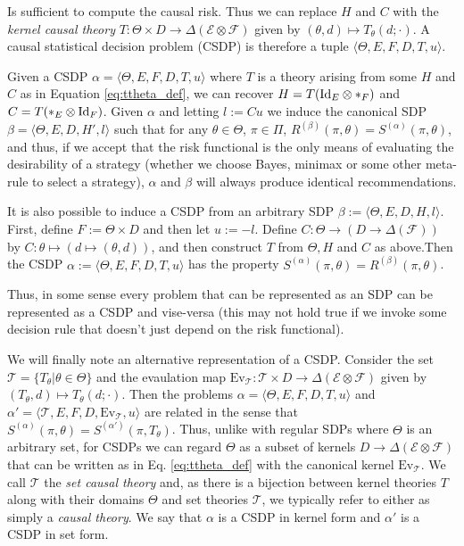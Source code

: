 Is sufficient to compute the causal risk.  Thus we can replace $H$ and $C$ with the \emph{kernel causal theory} $T:\Theta\times D\to \Delta(\mathcal{E}\otimes\mathcal{F})$ given by $(\theta,d)\mapsto T_\theta(d;\cdot)$. A causal statistical decision problem (CSDP) is therefore a tuple $\langle \Theta, E, F, D, T, u\rangle$.

Given a CSDP $\alpha = \langle \Theta, E, F, D, T, u\rangle$ where $T$ is a theory arising from some $H$ and $C$ as in Equation \ref{eq:ttheta_def}, we can recover $H= T(\text{Id}_{E}\otimes *_F)$ and $C=T(*_E\otimes \text{Id}_{F})$. Given $\alpha$ and letting $l:= Cu$ we induce the canonical SDP $\beta=\langle \Theta, E, D, H', l\rangle$ such that for any $\theta\in \Theta$, $\pi\in \Pi$, $R^{(\beta)}(\pi,\theta) = S^{(\alpha)}(\pi,\theta)$, and thus, if we accept that the risk functional is the only means of evaluating the desirability of a strategy (whether we choose Bayes, minimax or some other meta-rule to select a strategy), $\alpha$ and $\beta$ will always produce identical recommendations.

It is also possible to induce a CSDP from an arbitrary SDP $\beta:=\langle \Theta, E, D, H, l\rangle$. First, define $F:=\Theta\times D$ and then let $u:=-l$. Define $C:\Theta\to (D\to \Delta(\mathcal{F}))$ by $C:\theta\mapsto (d\mapsto (\theta,d))$, and then construct $T$ from $\Theta, H$ and $C$ as above.Then the CSDP $\alpha:=\langle \Theta, E, F, D, T, u\rangle$ has the property $S^{(\alpha)}(\pi, \theta) = R^{(\beta)}(\pi,\theta)$.

Thus, in some sense every problem that can be represented as an SDP can be represented as a CSDP and vise-versa (this may not hold true if we invoke some decision rule that doesn't just depend on the risk functional).

We will finally note an alternative representation of a CSDP. Consider the set $\mathscr{T} = \{T_\theta|\theta\in \Theta\}$ and the evaulation map $\mathrm{Ev}_{\mathscr{T}}:\mathscr{T}\times D\to \Delta(\mathcal{E}\otimes\mathcal{F})$ given by $(T_\theta,d)\mapsto T_\theta(d;\cdot)$. Then the problems $\alpha = \langle \Theta, E, F, D, T, u\rangle$ and $\alpha'=\langle \mathscr{T}, E, F, D, \mathrm{Ev}_{\mathcal{T}}, u\rangle$ are related in the sense that $S^{(\alpha)}(\pi,\theta)=S^{(\alpha')}(\pi,T_\theta)$. Thus, unlike with regular SDPs where $\Theta$ is an arbitrary set, for CSDPs we can regard $\Theta$ as a subset of kernels $D\to \Delta(\mathcal{E}\otimes\mathcal{F})$ that can be written as in Eq. \ref{eq:ttheta_def}  with the canonical kernel $\mathrm{Ev}_{\mathscr{T}}$. We call $\mathscr{T}$ the \emph{set causal theory} and, as there is a bijection between kernel theories $T$ along with their domains $\Theta$ and set theories $\mathscr{T}$, we typically refer to either as simply a \emph{causal theory}. We say that $\alpha$ is a CSDP in kernel form and $\alpha'$ is a CSDP in set form.

